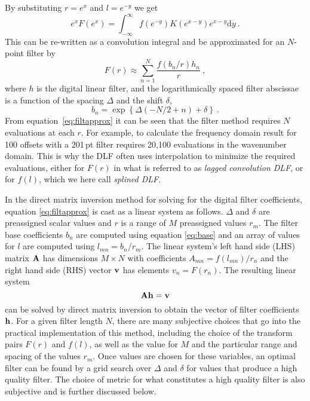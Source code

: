 \documentclass[paper,twocolumn,twoside]{geophysics}
\newcommand{\mr}[1]{\mathrm{#1}}
\begin{document}
By substituting $r = e^x$ and $l = e^{-y}$ we get
%
\begin{equation}
  e^x F(e^x) = \int^\infty_{-\infty} f(e^{-y})K(e^{x-y})e^{x-y}\mr{d}y\ .
  \label{eq:filtint}
\end{equation}
%
This can be re-written as a convolution integral and be approximated for an
$N$-point filter by
%
\begin{equation}
  F(r) \approx \sum^N_{n=1} \frac{f(b_n/r) h_n}{r}\ ,
  \label{eq:filtapprox}
\end{equation}
%
where $h$ is the digital linear filter, and the logarithmically spaced filter
abscissae is a function of the spacing $\Delta$ and the shift $\delta$,
%
\begin{equation}
  b_n = \exp\left\{\Delta(-N/2+n) + \delta\right\} \ .
  \label{eq:base}
\end{equation}
%
From equation~\ref{eq:filtapprox} it can be seen that the filter method
requires $N$ evaluations at each $r$. For example, to calculate the frequency
domain result for 100 offsets with a 201\,pt filter requires 20,100 evaluations
in the wavenumber domain. This is why the DLF often uses interpolation to
minimize the required evaluations, either for $F(r)$ in what is referred to as
\emph{lagged convolution DLF}, or for $f(l)$, which we here call \emph{splined
DLF}.

In the direct matrix inversion method for solving for the digital filter
coefficients, equation \ref{eq:filtapprox} is cast as a linear system as
follows. $\Delta$ and $\delta$ are preassigned scalar values and $r$ is a range
of $M$ preassigned values $r_m$. The filter base coefficients $b_n$ are
computed using equation \ref{eq:base} and an array of values for $l$ are
computed using $l_{mn} = b_n/r_m$. The linear system's left hand side (LHS)
matrix $\bf{A}$ has dimensions $M \times N$ with coefficients $A_{mn} =
f(l_{mn})/r_n$ and the right hand side (RHS) vector $\bf{v}$ has elements $v_n
= F(r_n)$. The resulting linear system
%
\begin{equation}
  \bf{A}\bf{h} = \bf{v}
  \label{eq:,linearSystem}
\end{equation}
%
can be solved by direct matrix inversion to obtain the vector of filter
coefficients $\bf{h}$. For a given filter length $N$, there are many subjective
choices that go into the practical implementation of this method, including the
choice of the transform pairs $F(r)$ and $f(l)$, as well as the value for $M$
and the particular range and spacing of the values $r_m$. Once values are
chosen for these variables, an optimal filter can be found by a grid search
over $\Delta$ and $\delta$ for values that produce a high quality filter. The
choice of metric for what constitutes a high quality filter is also subjective
and is further discussed below.
\end{document}
